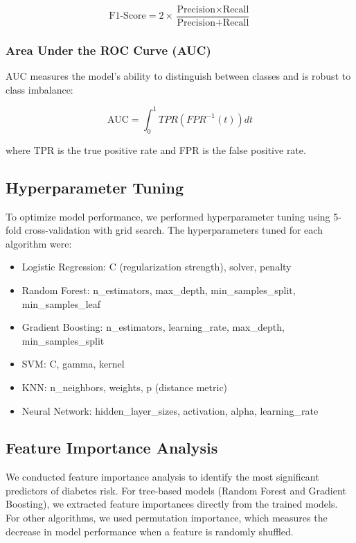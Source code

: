 \documentclass[conference]{IEEEtran}
\begin{document}
\begin{equation}
\text{F1-Score} = 2 \times \frac{\text{Precision} \times \text{Recall}}{\text{Precision} + \text{Recall}}
\end{equation}

\subsubsection{Area Under the ROC Curve (AUC)}
AUC measures the model's ability to distinguish between classes and is robust to class imbalance:

\begin{equation}
\text{AUC} = \int_{0}^{1} TPR(FPR^{-1}(t)) dt
\end{equation}

where TPR is the true positive rate and FPR is the false positive rate.

\subsection{Hyperparameter Tuning}
To optimize model performance, we performed hyperparameter tuning using 5-fold cross-validation with grid search. The hyperparameters tuned for each algorithm were:

\begin{itemize}
    \item Logistic Regression: C (regularization strength), solver, penalty
    \item Random Forest: n\_estimators, max\_depth, min\_samples\_split, min\_samples\_leaf
    \item Gradient Boosting: n\_estimators, learning\_rate, max\_depth, min\_samples\_split
    \item SVM: C, gamma, kernel
    \item KNN: n\_neighbors, weights, p (distance metric)
    \item Neural Network: hidden\_layer\_sizes, activation, alpha, learning\_rate
\end{itemize}

\subsection{Feature Importance Analysis}
We conducted feature importance analysis to identify the most significant predictors of diabetes risk. For tree-based models (Random Forest and Gradient Boosting), we extracted feature importances directly from the trained models. For other algorithms, we used permutation importance, which measures the decrease in model performance when a feature is randomly shuffled.
\end{document}
